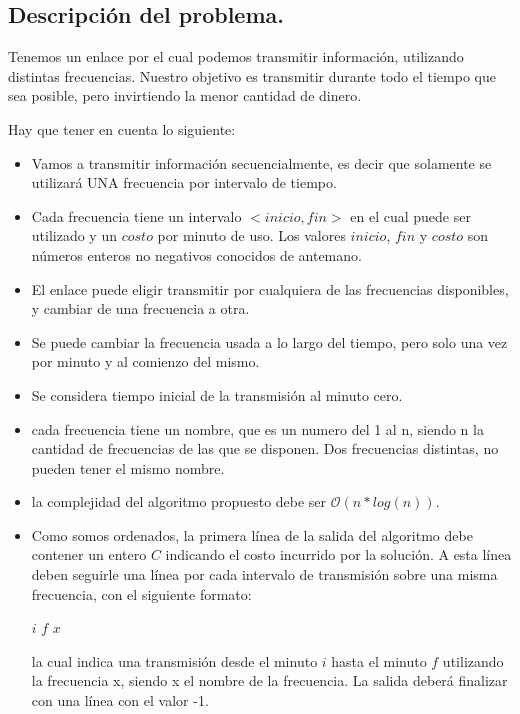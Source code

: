 \subsection{Descripción del problema.}

\vspace*{0.3cm}

Tenemos un enlace por el cual podemos transmitir información, utilizando distintas frecuencias.
Nuestro objetivo es transmitir durante todo el tiempo que sea posible, pero invirtiendo la menor cantidad de dinero.

Hay que tener en cuenta lo siguiente:

\begin{itemize}
	\item Vamos a transmitir información secuencialmente, es decir que solamente se utilizará UNA frecuencia por intervalo de tiempo.
	\item Cada frecuencia tiene un intervalo $<inicio, fin>$ en el cual puede ser utilizado y un $costo$ por minuto de uso. Los valores $inicio$, $fin$ y $costo$ son números enteros no negativos conocidos de antemano.
	\item El enlace puede eligir transmitir por cualquiera de las frecuencias disponibles, y cambiar de una frecuencia a otra.
	\item Se puede cambiar la frecuencia usada a lo largo del tiempo, pero solo una vez por minuto y al comienzo del mismo.
	\item Se considera tiempo inicial de la transmisión al minuto cero.
	\item cada frecuencia tiene un nombre, que es un numero del 1 al n, siendo n la cantidad de frecuencias de las que se disponen. Dos frecuencias distintas, no pueden tener el mismo nombre.
	\item la complejidad del algoritmo propuesto debe ser $\mathcal{O}(n*log(n))$.
	\item Como somos ordenados, la primera línea de la salida del algoritmo debe contener un entero $C$ indicando el costo incurrido por la solución. A esta línea deben seguirle una línea por cada intervalo de transmisión sobre una misma frecuencia, con el siguiente formato:
	
$i$ $f$ $x$

la cual indica una transmisión desde el minuto $i$ hasta el minuto $f$ utilizando la frecuencia x, siendo x el nombre de la frecuencia. La salida deberá finalizar con una línea con el valor -1.
\end{itemize}

